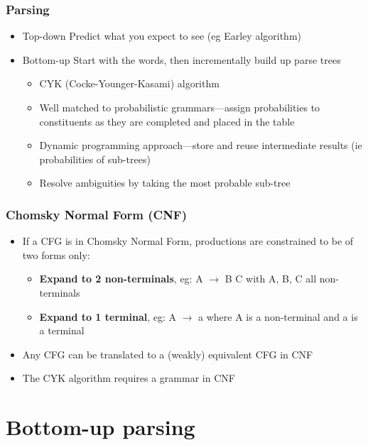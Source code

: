 \begin{frame}
  \frametitle{Parsing}
  \begin{itemize}
  \item \alert{Top-down} Predict what you expect to see (eg Earley algorithm)
  \item \alert{Bottom-up} Start with the words, then incrementally build up
    parse trees
    \begin{itemize}
    \item CYK (Cocke-Younger-Kasami) algorithm
    \item Well matched to probabilistic grammars---assign
      probabilities to constituents as they are completed and placed
      in the table
    \item Dynamic programming approach---store and reuse intermediate
      results (ie probabilities of sub-trees)
    \item Resolve ambiguities by taking the most probable sub-tree
    \end{itemize}
  \end{itemize}
\end{frame}

\begin{frame}
  \frametitle{Chomsky Normal Form (CNF)}
  \begin{itemize}
  \item If a CFG is in \alert{Chomsky Normal Form}, productions are constrained to be of
    two forms only:
    \begin{itemize}
    \item \textbf{Expand to 2 non-terminals}, eg: A $\rightarrow$ B C \newline
      with A, B, C all non-terminals
    \item \textbf{Expand to 1 terminal}, eg: A $\rightarrow$ a \newline
      where A is a non-terminal and a is a terminal
    \end{itemize}
  \item Any CFG can be translated to a (weakly) equivalent CFG in CNF
  \item The CYK algorithm requires a grammar in CNF
  \end{itemize}
\end{frame}

\section{Bottom-up parsing}

